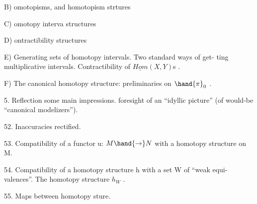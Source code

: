 B) omotopisms, and homotopism strtures

C) omotopy interva structures

D) ontractibility structures

E) Generating sets of homotopy intervals. Two standard ways of get-%
ting multiplicative intervals. Contractibility of $\underline{Hom}(X,Y)$s .

F) The canonical homotopy structure: preliminaries on $\hand{\pi}_{0}$ .

\hand{(}5.\hand{)} Reflection  some main impressions.  foresight of an ``idyllic
picture'' (of would-be ``canonical modelizers'').

52.  Inaccuracies rectified.

53.  Compatibility of a functor u: $M\hand{\rightarrow}N$ with a homotopy structure on M.

54.  Compatibility of a homotopy structure h with a set W of ``weak equi-%
valences''.  The homotopy structure $h_{W}$ .

55.  Maps between homotopy sture.

